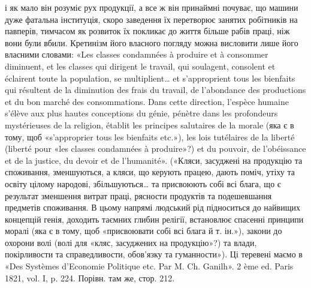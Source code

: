 і як мало він розуміє рух продукції, а все ж він принаймні почуває,
що машини дуже фатальна інституція, скоро заведення їх перетворює
занятих робітників на павперів, тимчасом як розвиток їх покликає до
життя більше рабів праці, ніж вони були вбили. Кретинізм його власного
погляду можна висловити лише його власними словами: «Les classes
condamnées à produire et à consommer diminuent, et les classes qui dirigent
le travail, qui soulagent, consolent et éclairent toute la population,
se multiplient\dots{} et s’approprient tous les bienfaits qui résultent de la diminution
des frais du travail, de l’abondance des productions et du bon marché
des consommations. Dans cette direction, l’espèce humaine s’élève aux plus
hautes conceptions du génie, pénètre dans les profondeurs mystérieuses de la
religion, établit les principes salutaires de la morale (яка є в тому, щоб «s’approprier
tous les bienfaits etc.»), les lois tutélaires de la liberté (liberté pour
«les classes condamnées à produire»?) et du pouvoir, de l’obéissance et de
la justice, du devoir et de l’humanité». («Кляси, засуджені на продукцію
та споживання, зменшуються, а кляси, що керують працею, дають поміч,
утіху та освіту цілому народові, збільшуються\dots{} та присвоюють собі
всі блага, що є результат зменшення витрат праці, рясности продуктів
та подешевшання предметів споживання. В цьому напрямі людський
рід підноситься до найвищих концепцій генія, доходить таємних глибин
релігії, встановлює спасенні принципи моралі (яка є в тому, щоб «присвоювати
собі всі блага й т. ін.»), закони до охорони волі (волі для «кляс,
засуджених на продукцію»?) та влади, покірливости та справедливости,
обов’язку та гуманности»). Ці теревені маємо в «Des Systèmes d’Economie
Politique etc. Par M. Ch. Ganilh». 2 ème ed. Paris 1821, vol. I, p. 224.
Порівн. там же, стор. 212.
\parbreak{}  %
